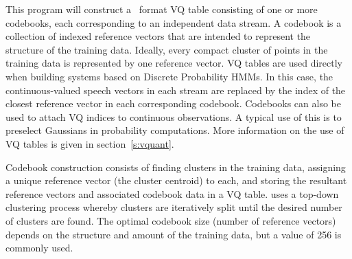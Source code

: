 %
%

\newpage
{}


This program will construct a \HTK\ format VQ table consisting of one or
more codebooks, each corresponding to an independent data stream.  
A codebook is a collection of indexed reference vectors that are intended to
represent the structure of the training data. Ideally, every compact
cluster of points in the training data is represented by one reference
vector.  VQ
tables are used directly when building systems based on Discrete
Probability HMMs.  In this case, the continuous-valued speech vectors
in each stream are replaced by the index of the closest reference
vector in each corresponding codebook.
Codebooks can also be used to attach VQ indices to
continuous observations.  A typical use of this is to preselect
Gaussians in probability computations.  More information on the
use of VQ tables is given in section~\ref{s:vquant}.

Codebook construction consists of finding clusters in the training data,
assigning a unique reference vector (the cluster centroid) to each,
and storing the resultant reference vectors and associated codebook data
in a VQ table.  uses a top-down clustering process whereby
clusters are iteratively split until the desired number of clusters are
found. The optimal codebook size (number of reference vectors) depends
on the structure and amount of the training data, but a value of 256 is
commonly used.

